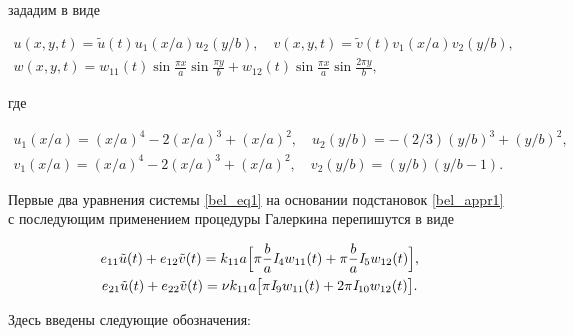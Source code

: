 зададим в виде

\begin{gather}\label{bel_appr1}

u(x,y,t)=\tilde{u}(t)u_1 ({x}/{a} )u_2 ({y}/{b} ), \quad 

v(x,y,t)=\tilde{v}(t)v_1({x}/{a} )v_2 ({y}/{b} ),

\\

w(x,y,t)=w_{11}(t)\sin \frac{\pi x}{a} \sin\frac{\pi y}{b} +w_{12}(t)\sin \frac{\pi x}{a} \sin\frac{2\pi y}{b},

\end{gather}

где 

\begin{gather}

u_1({x}/{a}) =( {x}/{a})^4-2( {x}/{a})^3+( {x}/{a})^2,\quad

u_2({y}/{b}) =-({2}/{3})( {y}/{b})^3+( {y/}{b})^2,\\ 

v_1({x}/{a}) =({x}/{a})^4-2( {x}/{a})^3+( {x}/{a})^2,

\quad 

v_2({y}/{b}) =({y}/{b})( {y}/{b}-1).

\end{gather}



Первые два уравнения системы \eqref{bel_eq1} на основании подстановок \eqref{bel_appr1} с последующим применением процедуры Галеркина \cite{myl-bib:27,  myl-bib:29}  перепишутся в виде 

\begin{gather}

e_{11}\tilde{u}(t)+e_{12}\tilde{v}(t)=k_{11}a\Bigl[ \pi \frac{b}{a}\mathit{I}_4 w_{11}(t)+\pi\frac{b}{a}\mathit{I}_5 w_{12}(t) \Bigr],

\\

\label{bel_eq7}

e_{21}\tilde{u}(t)+e_{22}\tilde{v}(t)=\nu k_{11} a \bigl[ \pi \mathit{I}_9 w_{11}(t)+2 \pi \mathit{I}_{10} w_{12}(t)\bigr].

\end{gather}

Здесь введены следующие обозначения:

